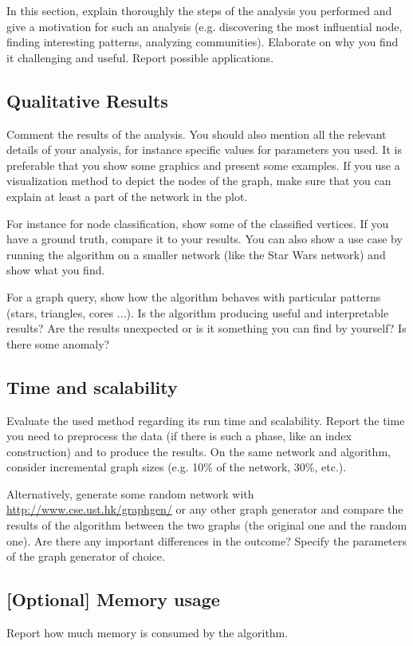 \documentclass[11pt,a4paper,onecolumn,notitlepage]{article}
\begin{document}
In this section, explain thoroughly the steps of the analysis you performed and give a motivation for such an analysis (e.g. discovering the most influential node, finding interesting patterns, analyzing communities). Elaborate on why you find it challenging and useful. Report possible applications.  

\subsection{Qualitative Results}

Comment the results of the analysis. You should also mention all the relevant details of your analysis, for instance specific values for parameters you used. It is preferable that you show some graphics and present some examples. If you use a visualization method to depict the nodes of the graph, make sure that you can explain at least a part of the network in the plot. 

For instance for node classification, show some of the classified vertices. If you have a ground truth, compare it to your results. You can also show a use case by running the algorithm on a smaller network (like the Star Wars network) and show what you find. 

For a graph query, show how the algorithm behaves with particular patterns (stars, triangles, cores ...).  Is the algorithm producing useful and interpretable results? Are the results unexpected or is it something you can find by yourself? Is there some anomaly?

\subsection{Time and scalability}

Evaluate the used method regarding its run time and scalability. Report the time you need to preprocess  the data (if there is such a phase, like an index construction) and to produce the results. On the same network and algorithm, consider incremental graph sizes (e.g. 10\% of the network, 30\%, etc.). 

\smallskip
\noindent Alternatively, generate some random network with \url{http://www.cse.ust.hk/graphgen/} or any other graph generator and compare the results of the algorithm between the two graphs (the original one and the random one). Are there any important differences in the outcome? Specify the parameters of the graph generator of choice. 


\subsection{[Optional] Memory usage}
Report how much memory is consumed by the algorithm. 
\end{document}
